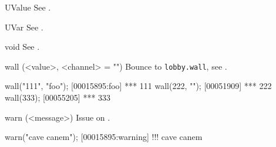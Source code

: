 \begin{urbiscriptapi}
\item[UValue] See .

\item[UVar] See .
\item[void] See .
\item[wall](<value>, <channel> = "")%
  Bounce to \lstinline|lobby.wall|, see .
\begin{urbiscript}
wall("111", "foo");
[00015895:foo] *** 111
wall(222, "");
[00051909] *** 222
wall(333);
[00055205] *** 333
\end{urbiscript}

\item[warn](<message>)%
  Issue  on .
\begin{urbiscript}
warn("cave canem");
[00015895:warning] !!! cave canem
\end{urbiscript}

\end{urbiscriptapi}

